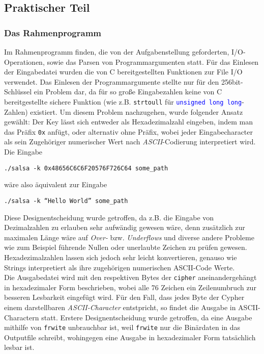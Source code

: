 \documentclass[course=erap]{aspdoc}
\begin{document}
\subsection{Praktischer Teil}
\subsubsection{Das Rahmenprogramm} \label{main}
Im Rahmenprogramm finden, die von der Aufgabenstellung geforderten, I/O-Opera\-tionen, sowie das Parsen von Programmargumenten statt.
Für das Einlesen der Eingabe\-datei wurden die von C bereitgestellten Funktionen zur File I/O verwendet. Das Einlesen der Programmargumente stellte nur für den 256bit-Schlüssel
ein Problem dar, da für so große Eingabezahlen keine von C bereitgestellte sichere Funktion (wie z.B. \texttt{strtoull} für \texttt{\textcolor{blue}{unsigned long long}}-Zahlen) existiert.
Um diesem Problem nachzugehen, wurde folgender Ansatz gewählt:
Der Key lässt sich entweder als Hexadezimalzahl eingeben, indem man das Präfix \texttt{0x} anfügt, oder alternativ ohne Präfix, wobei jeder Eingabecharacter als sein Zugehöriger numerischer Wert
nach \emph{ASCII}-Codierung inter\-pre\-tiert wird. Die Eingabe 
\begin{center}
  \texttt{./salsa -k 0x48656C6C6F20576F726C64  some\_path}
\end{center} 
wäre also äquivalent zur Eingabe
\begin{center}
   \texttt{./salsa -k ``Hello World'' some\_path}
\end{center}
Diese Designentscheidung wurde getroffen, da z.B. die Eingabe von Dezimalzahlen zu erlauben sehr aufwändig gewesen wäre, denn zusätzlich zur maximalen Länge wäre auf \emph{Over-} bzw. \emph{Underflows} und diverse andere Probleme wie zum
Beispiel führende Nullen oder unerlaubte Zeichen zu prüfen gewesen. Hexadezimalzahlen lassen sich jedoch sehr leicht konvertieren, genauso wie Strings interpretiert als ihre zugehörigen numerischen ASCII-Code Werte.
\\Die Ausgabedatei wird mit den respektiven Bytes der \texttt{cipher} an\-einander\-ge\-hängt in hexadezimaler Form beschrieben, wobei alle 76 Zeichen ein Zeilenumbruch zur besseren Lesbarkeit eingefügt wird.
Für den Fall, dass jedes Byte der Cypher einem darstellbaren \emph{ASCII-Character} entstpricht, so findet die Ausgabe in ASCII-Charactern statt. Erstere Designentscheidung wurde getroffen, 
da eine Ausgabe mithilfe von \texttt{frwite} unbrauchbar ist, weil \texttt{frwite} nur die Binärdaten in das Outputfile schreibt, wohingegen eine Ausgabe in hexadezimaler Form tatsächlich lesbar ist.
\end{document}
